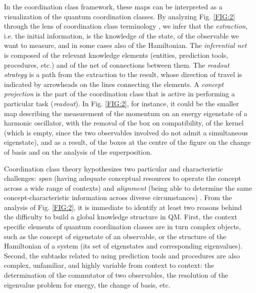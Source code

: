 \documentclass[twocolumn,secnumarabic,amssymb, nobibnotes, aps, prd, nofootinbib]{revtex4-2}
\begin{document}
In the coordination class framework, these maps can be interpreted as a visualization of the quantum coordination classes. By analyzing Fig. \ref{FIG:2} through the lens of coordination class terminology \cite{diSessa2016}, we infer that the \emph{extraction}, i.e. the initial information, is the knowledge of the state, of the observable we want to measure, and in some cases also of the Hamiltonian. The \emph{inferential net} is composed of the relevant knowledge elements (entities, prediction tools, procedures, etc.) and of the net of connections between them. The \emph{readout strategy} is a path from the extraction to the result, whose direction of travel is indicated by arrowheads on the lines connecting the elements. A \emph{concept projection} is the part of the coordination class that is active in performing a particular task (\emph{readout}). In Fig. \ref{FIG:2}, for instance, it could be the smaller map describing the measurement of the momentum on an energy eigenstate of a harmonic oscillator, with the removal of the box on compatibility, of the kernel (which is empty, since the two observables involved do not admit a simultaneous eigenstate), and as a result, of the boxes at the centre of the figure on the change of basis and on the analysis of the superposition.

Coordination class theory hypothesizes two particular and characteristic challenges: \emph{span} (having adequate conceptual resources to operate the concept across a wide range of contexts) and \emph{alignment} (being able to determine the same concept-characteristic information across diverse circumstances) \cite{Levrini2008}. From the analysis of Fig. \ref{FIG:2}, it is immediate to identify at least two reasons behind the difficulty to build a global knowledge structure in QM. First, the context specific elements of quantum coordination classes are in turn complex objects, such as the concept of eigenstate of an observable, or the structure of the Hamiltonian of a system (its set of eigenstates and corresponding eigenvalues). Second, the subtasks related to using prediction tools and procedures are also complex, unfamiliar, and highly variable from context to context: the determination of the commutator of two observables, the resolution of the eigenvalue problem for energy, the change of basis, etc.
\end{document}
